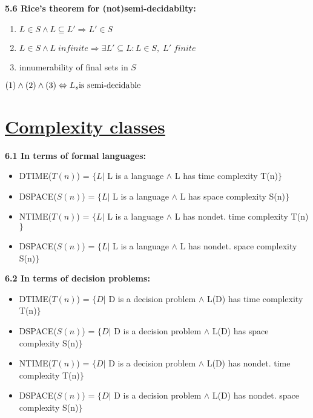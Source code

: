 \documentclass{article}
\begin{document}
\begin{multicols}{2}
\textbf{5.6 Rice's theorem for (not)semi-decidabilty:}
\begin{enumerate}
    \setlength\itemsep{-0.4em}
    \item $L \in S \wedge L \subseteq L' \Rightarrow L' \in S$
    \item $L \in S \wedge L\; infinite \Rightarrow \exists L' \subseteq L: L \in S,\; L'\; finite$
    \item innumerability of final sets in $S$
\end{enumerate}
\begin{center}
    \begin{math}
        (1) \wedge (2) \wedge (3) \Leftrightarrow L_s $is semi-decidable$
    \end{math}
\end{center}


\section{\underline{Complexity classes}}

\textbf{6.1 In terms of formal languages:}
\begin{itemize}
    \setlength\itemsep{-0.4em}
    \item DTIME($T(n)$)  = $\{ L |$ L is a language $\wedge$ L has time complexity T(n)$\}$
    \item DSPACE($S(n)$) = $\{ L |$ L is a language $\wedge$ L has space complexity S(n)$\}$
    \item NTIME($T(n)$)  = $\{ L |$ L is a language $\wedge$ L has nondet. time complexity T(n)$\}$
    \item DSPACE($S(n)$) = $\{ L |$ L is a language $\wedge$ L has nondet. space complexity S(n)$\}$
\end{itemize}

\textbf{6.2 In terms of decision problems:}
\begin{itemize}
    \setlength\itemsep{-0.4em}
    \item DTIME($T(n)$)  = $\{ D |$ D is a decision problem $\wedge$ L(D) has time complexity T(n)$\}$
    \item DSPACE($S(n)$) = $\{ D |$ D is a decision problem $\wedge$ L(D) has space complexity S(n)$\}$
    \item NTIME($T(n)$)  = $\{ D |$ D is a decision problem $\wedge$ L(D) has nondet. time complexity T(n)$\}$
    \item DSPACE($S(n)$) = $\{ D |$ D is a decision problem $\wedge$ L(D) has nondet. space complexity S(n)$\}$
\end{itemize}


\end{multicols}
\end{document}
